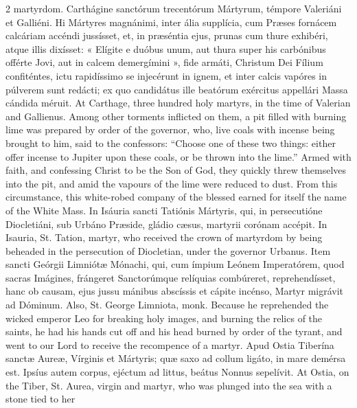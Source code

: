 \begin{paracol}{2}
 martyrdom.
\switchcolumn*
{}
Carthágine sanctórum 
 trecentórum Mártyrum, témpore Valeriáni et Galliéni. Hi Mártyres 
 magnánimi, inter ália supplícia, cum Præses fornácem calcáriam accéndi 
 jussísset, et, in præséntia ejus, prunas cum thure exhibéri, atque illis 
 dixísset: « Elígite e duóbus unum, aut thura super his carbónibus offérte 
 Jovi, aut in calcem demergímini », fide armáti, Christum Dei Fílium 
 confiténtes, ictu rapidíssimo se injecérunt in ignem, et inter calcis 
 vapóres in púlverem sunt redácti; ex quo candidátus ille beatórum exércitus 
 appellári Massa cándida méruit.
\switchcolumn
{}
At Carthage, three hundred holy 
 martyrs, in the time of Valerian and Gallienus. Among other torments 
 inflicted on them, a pit filled with burning lime was prepared by order of 
 the governor, who, live coals with incense being brought to him, said to the 
 confessors: ``Choose one of these two things: either offer incense to Jupiter 
 upon these coals, or be thrown into the lime.'' Armed with faith, and 
 confessing Christ to be the Son of God, they quickly threw themselves into 
 the pit, and amid the vapours of the lime were reduced to dust. From 
 this circumstance, this white-robed company of the blessed earned for itself 
 the name of the White Mass.
\switchcolumn*
{}
In Isáuria sancti 
 Tatiónis Mártyris, qui, in persecutióne Diocletiáni, sub Urbáno Præside, 
 gládio cæsus, martyrii corónam accépit.
\switchcolumn
{}
In Isauria, St. Tation, martyr, who 
 received the crown of martyrdom by being beheaded in the persecution of 
 Diocletian, under the governor Urbanus.
\switchcolumn*
{}
Item sancti Geórgii 
 Limniótæ Mónachi, qui, cum ímpium Leónem Imperatórem, quod sacras Imágines, 
 frángeret Sanctorúmque relíquias combúreret, reprehendísset, hanc ob causam, 
 ejus jussu mánibus abscíssis et cápite incénso, Martyr migrávit ad Dóminum.
\switchcolumn
{}
Also, St. George Limniota, monk. 
 Because he reprehended the wicked emperor Leo for breaking holy images, and 
 burning the relics of the saints, he had his hands cut off and his head 
 burned by order of the tyrant, and went to our Lord to receive the 
 recompence of a martyr.
\switchcolumn*
{}
Apud Ostia Tiberína 
 sanctæ Aureæ, Vírginis et Mártyris; quæ saxo ad collum ligáto, in mare 
 demérsa est. Ipsíus autem corpus, ejéctum ad littus, beátus Nonnus 
 sepelívit.
\switchcolumn
{}
At Ostia, on the Tiber, St. Aurea, 
 virgin and martyr, who was plunged into the sea with a stone tied to her 

\end{paracol}
